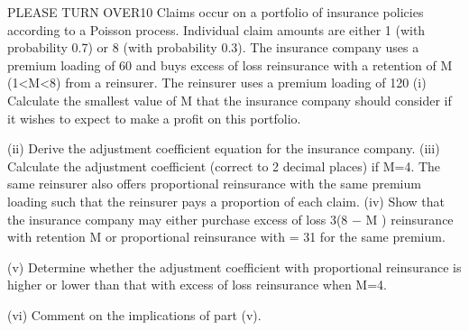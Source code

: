 \documentclass[a4paper,12pt]{article}
\begin{document}
PLEASE TURN OVER10
Claims occur on a portfolio of insurance policies according to a Poisson process.
Individual claim amounts are either 1 (with probability 0.7) or 8 (with probability
0.3). The insurance company uses a premium loading of 60%
and buys excess of loss reinsurance with a retention of M (1<M<8) from a reinsurer.
The reinsurer uses a premium loading of 120%
(i) Calculate the smallest value of M that the insurance company should consider
if it wishes to expect to make a profit on this portfolio.

(ii) Derive the adjustment coefficient equation for the insurance company. 
(iii) Calculate the adjustment coefficient (correct to 2 decimal places) if M=4. 
The same reinsurer also offers proportional reinsurance with the same premium
loading such that the reinsurer pays a proportion \alpha  of each claim.
(iv) Show that the insurance company may either purchase excess of loss
3(8 − M )
reinsurance with retention M or proportional reinsurance with \alpha  =
31
for the same premium.

(v) Determine whether the adjustment coefficient with proportional reinsurance is
higher or lower than that with excess of loss reinsurance when M=4.

(vi) Comment on the implications of part (v).
\end{document}
